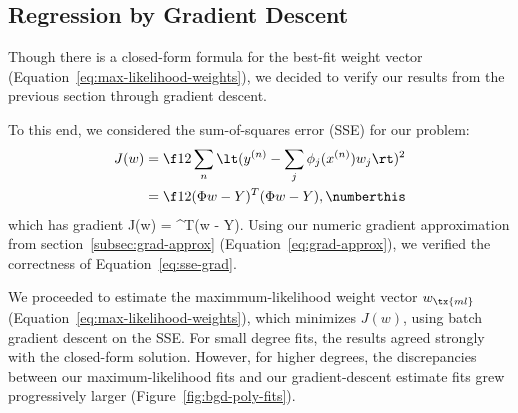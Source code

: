 \documentclass{article}
\begin{document}
\begin{multicols}{2}
\subsection{Regression by Gradient Descent}

Though there is a closed-form formula for the best-fit weight vector (Equation~\ref{eq:max-likelihood-weights}), we decided to verify our results from the previous section through gradient descent.

To this end, we considered the sum-of-squares error (SSE) for our problem:
\begin{align*}
J(w) &= \f12 \sum_n \lt(y^{(n)} - \sum_j\phi_j(x^{(n)}) w_j\rt)^2 \\
&= \f12 (\Phi w - Y)^T(\Phi w - Y), \label{eq:sse}\numberthis
\end{align*}
which has gradient
\beq
\label{eq:sse-grad}
\nabla J(w) = \Phi^T(\Phi w - Y).
\eeq
Using our numeric gradient approximation from section~\ref{subsec:grad-approx} (Equation~\ref{eq:grad-approx}), we verified the correctness of Equation~\ref{eq:sse-grad}.

We proceeded to estimate the maximmum-likelihood weight vector $w_\tx{ml}$ (Equation~\ref{eq:max-likelihood-weights}), which minimizes $J(w)$, using batch gradient descent on the SSE.
For small degree fits, the results agreed strongly with the closed-form solution.
However, for higher degrees, the discrepancies between our maximum-likelihood fits and our gradient-descent estimate fits grew progressively larger (Figure~\ref{fig:bgd-poly-fits}).


\end{multicols}
\end{document}
